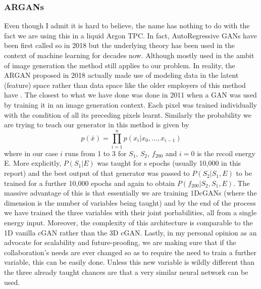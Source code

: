 \documentclass[11pt]{article} %
\begin{document}
\subsubsection{ARGANs}
Even though I admit it is hard to believe, the name has nothing to do with the fact we are using this in a liquid Argon TPC.
In fact, AutoRegressive GANs \cite{yazici2018autoregressive} \cite{zhao2019compression} have been first called so in 2018 but the underlying theory has been used in the context of machine learning for decades now.
Although mostly used in the ambit of image generation the method still applies to our problem.
In reality, the ARGAN proposed in 2018 actually made use of modeling data in the latent (feature) space rather than data space like the older
employers of this method have \cite{fu2019time}.
The closest to what we have done was done in 2011 \cite{oord2016pixel} when a GAN was used by training it in an image generation context.
Each pixel was trained individually with the condition of all its preceding pixels learnt.
Similarly the probability we are trying to teach our generator in this method is given by
\begin{equation}
  p(\bar x)= \prod_{i=1}^np(x_i|x_0,...,x_{i-1})
  \label{eq:prob_dist}
\end{equation}
where in our case $i$ runs from 1 to 3 for $S_1$, $S_2$, $f_200$ and $i=0$ is the recoil energy E.
More explicitly, $P(S_1|E)$ was taught for s epochs (usually 10,000 in this report) and the best output of that generator was
passed to $P(S_2|S_1,E)$ to be trained for a further 10,000 epochs and again to obtain $P(f_{200}|S_2,S_1,E)$.
The massive advantage of this is that essentially we are training 1DcGANs (where the dimension is the number of variables being taught) and
by the end of the process we have trained the three variables with their joint porbabilities, all from a single energy input.
Moreover, the complexity of this architecture is comparable to the 1D vanilla cGAN rather than the 3D cGAN.
Lastly, in my personal opinion as an advocate for scalability and future-proofing, we are making sure that if the collaboration's needs
are ever changed so as to require the need to train a further variable, this can be easily done.
Unless this new variable is wildly different than the three already taught chances are that a very similar neural network can be used.
\end{document}
